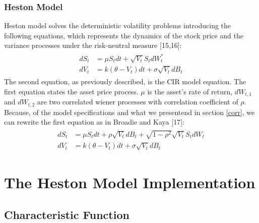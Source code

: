\documentclass[12pt,twoside]{reedthesis}
\theoremstyle{definition}
\theoremstyle{definition}
\theoremstyle{remark}
\begin{document}
  \subsection{Heston Model}\label{heston-model}
  
  Heston model solves the deterministic volatility problems introducing
  the following equations, which represents the dynamics of the stock
  price and the variance processes under the risk-neutral measure
  {[}15,16{]}:
  \begin{align}
  \label{eq:heston}
  \begin{split}
  dS_t &= \mu S_t dt + \sqrt{V_t} S_t dW^*_t \\
  dV_t &= k(\theta - V_t)dt + \sigma \sqrt{V_t} dB_t
  \end{split}
  \end{align}
  The second equation, as previously described, is the CIR model equation.
  The first equation states the asset price process. \(\mu\) is the
  asset's rate of return, \(dW_{t,1}\) and \(dW_{t,2}\) are two correlated
  wiener processes with correlation coefficient of \(\rho\). Because, of
  the model specifications and what we presentend in section \ref{corr},
  we can rewrite the first equation as in Broadie and Kaya {[}17{]}:
  \begin{align}
  \label{eq:heston2}
  \begin{split}
  dS_t &= \mu S_t dt + \rho \sqrt{V_t} dB_t + \sqrt{1 - \rho^2} \sqrt{V_t} S_t dW_t \\
  dV_t &= k(\theta - V_t)dt + \sigma \sqrt{V_t} dB_t
  \end{split}
  \end{align}
  \chapter{The Heston Model
  Implementation}\label{the-heston-model-implementation}
  
  \section{Characteristic Function}\label{characteristic-function}
  
\end{document}
